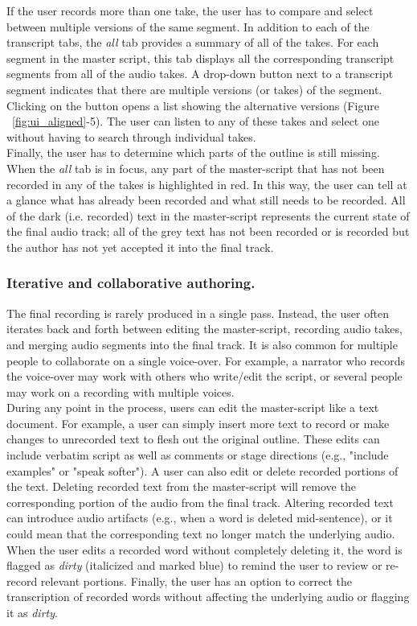 If the user records more than one take, the user has to compare and select between multiple versions of the same segment. In addition to each of the transcript tabs, the \textit{all} tab provides a summary of all of the takes. For each segment in the master script, this tab displays all the corresponding transcript segments from all of the audio takes. A drop-down button next to a transcript segment  indicates that there are multiple versions (or takes)  of the  segment. Clicking on the button opens a list showing the alternative versions (Figure ~\ref{fig:ui_aligned}-5). The user can listen to any of these takes and select one without having to search through individual takes. \\

Finally, the user has to determine which parts of the outline is still missing. When the \textit{all} tab is in focus, any part of the master-script that has not been recorded in any of the takes is highlighted in red. In this way, the user can tell at a glance what has already been recorded and what still needs to be recorded. All of the dark (i.e. recorded) text in the master-script represents the current state of the final audio track; all of the grey text has not been recorded or is recorded but the author has not yet accepted it into the final track. 

\subsubsection{Iterative and collaborative authoring.} 
The final recording is rarely produced in a single pass. Instead, the user often iterates back
and forth between editing the master-script, recording audio takes, and merging
audio segments into the final track. It is also common for multiple people to collaborate on a single voice-over. For example, a narrator who records the voice-over may work with others who write/edit the script, or several people may work on a recording with multiple voices. \\ 

During any point in the process, users can edit the master-script
like a text document.  For example, a user can simply insert
more text to record or make changes to unrecorded text to flesh
out the original outline. These edits can include verbatim script as well as comments or stage directions (e.g., "include examples" or "speak softer").
A user can also edit or delete recorded portions of the text. Deleting recorded text from the master-script will remove the corresponding portion of the audio from the final track. Altering recorded text can introduce audio artifacts (e.g., when a word is deleted mid-sentence), or it could mean that the corresponding text no longer match the underlying audio. When the user edits a recorded word without completely deleting it, the word is flagged as \textit{dirty} (italicized and marked blue) to remind the user to review or re-record relevant portions. Finally, the user has an option to correct the transcription of recorded words without affecting the underlying audio or flagging it as \textit{dirty}.\\

